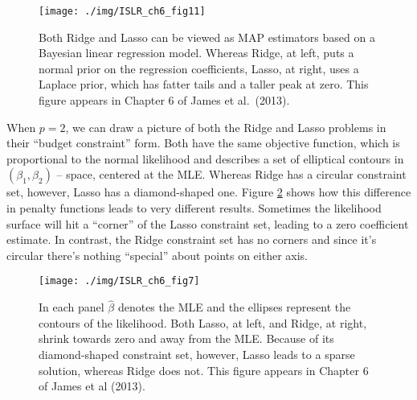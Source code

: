 \begin{figure}
	\centering
	\texttt{[image: ./img/ISLR\_ch6\_fig11]}
	\caption{Both Ridge and Lasso can be viewed as MAP estimators based on a Bayesian linear regression model. Whereas Ridge, at left, puts a normal prior on the regression coefficients, Lasso, at right, uses a Laplace prior, which has fatter tails and a taller peak at zero. This figure appears in Chapter 6 of James et al.\ (2013).}
	\label{fig:ridge_lasso_prior}
\end{figure}

When $p=2$, we can draw a picture of both the Ridge and Lasso problems in their ``budget constraint'' form. Both have the same objective function, which is proportional to the normal likelihood and describes a set of elliptical contours in $(\beta_1,\beta_2)$ -- space, centered at the MLE. Whereas Ridge has a circular constraint set, however, Lasso has a diamond-shaped one. Figure \ref{fig:ridge_lasso_constraint} shows how this difference in penalty functions leads to very different results. Sometimes the likelihood surface will hit a ``corner'' of the Lasso constraint set, leading to a zero coefficient estimate. In contrast, the Ridge constraint set has no corners and since it's circular there's nothing ``special'' about points on either axis.

\begin{figure}
	\centering
	\texttt{[image: ./img/ISLR\_ch6\_fig7]}
	\caption{In each panel $\widehat{\beta}$ denotes the MLE and the ellipses represent the contours of the likelihood. Both Lasso, at left, and Ridge, at right, shrink towards zero and away from the MLE. Because of its diamond-shaped constraint set, however, Lasso leads to a sparse solution, whereas Ridge does not. This figure appears in Chapter 6 of James et al (2013).}
	\label{fig:ridge_lasso_constraint}
\end{figure}

